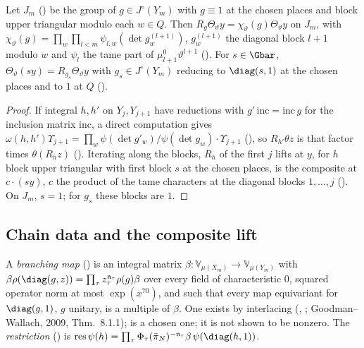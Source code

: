 \begin{proposition}
\label{ub-objects:prop:lowerlevel}
Let $J_m$ () be the group of $g\in J^\circ(Y_m)$ with $g\equiv1$ at the chosen
places and block upper triangular modulo each $w\in Q$. Then
$R_g\Theta_\vartheta y=\chi_\vartheta(g)\Theta_\vartheta y$ on $J_m$, with
$\chi_\vartheta(g)=\prod_w\prod_{l<m}\psi_{l,w}(\det g_w^{(l+1)})$, $g_w^{(l+1)}$ the diagonal block
$l+1$ modulo $w$ and $\psi_l$ the tame part of $\mu^0_{l+1}\vartheta^{l+1}$
(). For $s\in\Gbar$, $\Theta_\vartheta(s y)=R_{g_s}\Theta_\vartheta y$ with
$g_s\in J^\circ(Y_m)$ reducing to $\diag(s,1)$ at the chosen places and to $1$ at $Q$
().
\end{proposition}

\begin{proof}
If integral $h,h'$ on $Y_j,Y_{j+1}$ have reductions with $g'\,\mathrm{inc}=\mathrm{inc}\,g$ for the inclusion matrix
$\mathrm{inc}$, a direct computation gives $\omega(h,h')\Upsilon_{j+1}=\prod_w\psi(\det g'_w)/\psi(\det
g_w)\cdot\Upsilon_{j+1}$ (), so
$R_{h'}\theta z$ is that factor times $\theta(R_hz)$ (). Iterating
along the blocks, $R_h$ of the first $j$ lifts at $y$, for $h$ block upper triangular with first
block $s$ at the chosen places, is the composite at $c\cdot(sy)$, $c$ the product of the tame
characters at the diagonal blocks $1,\dots,j$
(). On $J_m$, $s=1$; for $g_s$ these
blocks are $1$.
\end{proof}

\subsection{Chain data and the composite lift}\label{ub-objects:sec:composite}

A \emph{branching map} () is an integral matrix
$\beta\colon \mathbb V_{\mu(X_m)}\to \mathbb V_{\mu(Y_m)}$ with $\beta\rho(\diag(g,z))=\prod_\tau
z_\tau^{\mathfrak n_\tau}\rho(g)\beta$ over every field of characteristic $0$, squared operator norm at most
$\exp(x^{70})$, and such that every map equivariant for $\diag(g,1)$, $g$ unitary, is a multiple of
$\beta$. One exists by interlacing (,
; Goodman--Wallach, 2009, Thm.~8.1.1); 
is a chosen one; it is not shown to be nonzero. The \emph{restriction} () is
$\operatorname{res}\psi(h)=\prod_\tau\Phi_\tau(\bar\pi_N)^{-\mathfrak n_\tau}\beta\,\psi(\diag(h,1))$.

